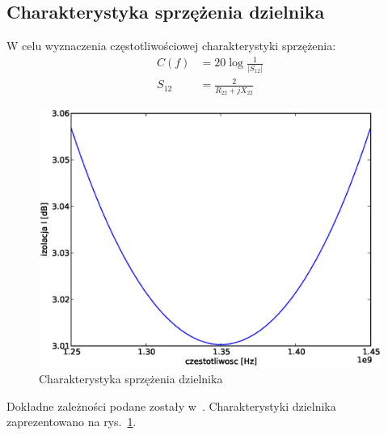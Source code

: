 \documentclass[rep.tex]{subfiles}
\begin{document}
\subsection{Charakterystyka sprzężenia dzielnika}
W celu wyznaczenia częstotliwościowej charakterystyki sprzężenia:
\begin{align}
  C(f) &= 20 \log \frac{1}{|S_{12}|} \label{eqn:zad15:C} \\
  S_{12} &= \frac{2}{R_{22} + jX_{22}}
\end{align}

\begin{figure}[!htbp]
  \centering
  \includegraphics[scale=0.5]{fig/zad15/freq}
  \caption{Charakterystyka sprzężenia dzielnika}
  \label{fig:zad15:freq}
\end{figure}

Dokładne zależności podane zostały w~\cite{obwody}.
Charakterystyki dzielnika zaprezentowano na rys.~\ref{fig:zad15:freq}.
\end{document}
